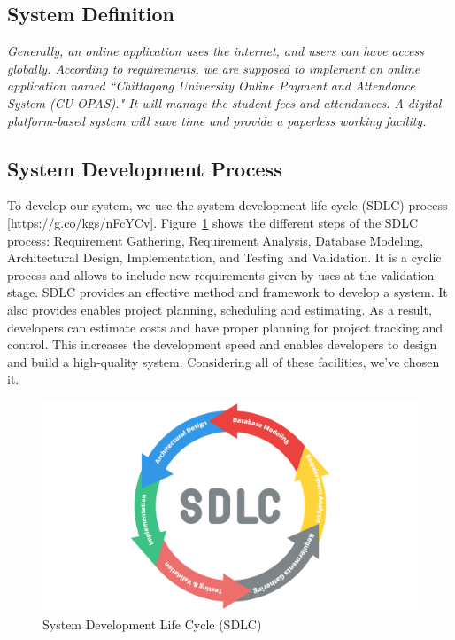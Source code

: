 \clearpage

\subsection{System Definition}\label{subsec:sd} 

\textit{Generally, an online application uses the internet, and users can have access globally. According to requirements, we are supposed to implement an online application named ``Chittagong University Online Payment and Attendance System (CU-OPAS)." It will manage the student fees and attendances. A digital platform-based system will save time and provide a paperless working facility.}


\subsection{System Development Process}\label{subsec:sdp}

To develop our system, we use the system development life cycle (SDLC) process [https://g.co/kgs/nFcYCv]. Figure~\ref{fig:sdlc} shows the different steps of the SDLC process: Requirement Gathering, Requirement Analysis, Database Modeling, Architectural Design, Implementation, and Testing and Validation. It is a cyclic process and allows to include new requirements given by uses at the validation stage. SDLC provides an effective method and framework to develop a system. It also provides enables project planning, scheduling and estimating. As a result, developers can estimate costs and have proper planning for project tracking and control. This increases the development speed and enables developers to design and build a high-quality system. Considering all of these facilities, we've chosen it.

\begin{figure}[H]
    \centering
    \includegraphics[width=1\textwidth]{images/sdlc}
    \caption{System Development Life Cycle (SDLC)}
    \label{fig:sdlc}
\end{figure}

